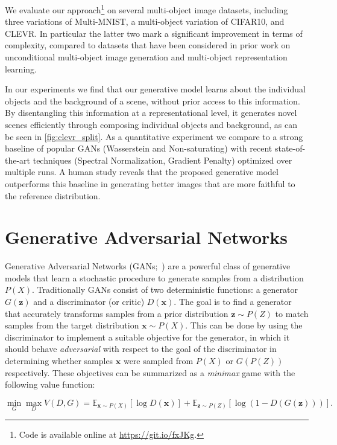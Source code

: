 \documentclass{article}
\begin{document}
We evaluate our approach\footnote{Code is available online at \url{https://git.io/fxJKg}.} on several multi-object image datasets, including three variations of Multi-MNIST, a multi-object variation of CIFAR10, and CLEVR.
In particular the latter two mark a significant improvement in terms of complexity, compared to datasets that have been considered in prior work on unconditional multi-object image generation and multi-object representation learning.

In our experiments we find that our generative model learns about the individual objects and the background of a scene, without prior access to this information.
By disentangling this information at a representational level, it generates novel scenes efficiently through composing individual objects and background, as can be seen in \autoref{fig:clevr_split}.
As a quantitative experiment we compare to a strong baseline of popular GANs (Wasserstein and Non-saturating) with recent state-of-the-art techniques (Spectral Normalization, Gradient Penalty) optimized over multiple runs.
A human study reveals that the proposed generative model outperforms this baseline in generating better images that are more faithful to the reference distribution. 

\section{Generative Adversarial Networks}
Generative Adversarial Networks (GANs;~\cite{goodfellow2014generative}) are a powerful class of generative models that learn a stochastic procedure to generate samples from a distribution $P(X)$.
Traditionally GANs consist of two deterministic functions: a generator $G(\bm{z})$ and a discriminator (or critic) $D(\bm{x})$.
The goal is to find a generator that accurately transforms samples from a prior distribution $\bm{z}\sim P(Z)$ to match samples from the target distribution $\bm{x}\sim P(X)$.
This can be done by using the discriminator to implement a suitable objective for the generator, in which it should behave \emph{adversarial} with respect to the goal of the discriminator in determining whether samples $\bm{x}$ were sampled from $P(X)$ or $G(P(Z))$ respectively.
These objectives can be summarized as a \emph{minimax} game with the following value function:

\begin{equation}
\min_G \max_D V(D, G) = \mathbb{E}_{\bm{x} \sim P(X)} \left[\log D(\bm{x})\right] + \mathbb{E}_{\bm{z}\sim P(Z)} \left[\log(1 - D(G(\bm{z}))) \right].
\label{eq:gan}
\end{equation}
\end{document}
